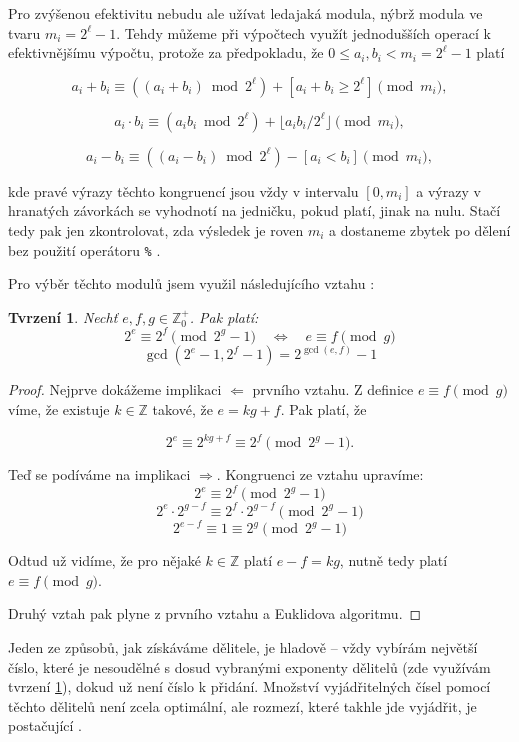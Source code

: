 \documentclass[titlepage]{article}
\newtheorem{claim}{Tvrzení}
\begin{document}
Pro zvýšenou efektivitu nebudu ale užívat ledajaká modula, nýbrž modula ve
tvaru $m_i = 2^{\ell} - 1$. Tehdy můžeme při výpočtech využít jednodušších
operací k efektivnějšímu výpočtu, protože za předpokladu, že $0 \leq a_i,b_i <
m_i = 2^{\ell} - 1$ platí

$$
a_i + b_i \equiv ((a_i+b_i)\bmod 2^{\ell})+[a_i +b_i\geq 2^{\ell}] \pmod{m_i},
$$

$$
a_i \cdot b_i \equiv (a_i b_i \bmod 2^{\ell}) + \lfloor a_i b_i /2^{\ell}\rfloor \pmod{m_i},
$$

$$
a_i - b_i \equiv ((a_i -b_i)\bmod 2^{\ell})-[a_i <b_i] \pmod{m_i},
$$

kde pravé výrazy těchto kongruencí jsou vždy v intervalu $[0, m_i]$ a výrazy v
hranatých závorkách se vyhodnotí na jedničku, pokud platí, jinak na nulu. Stačí
tedy pak jen zkontrolovat, zda výsledek je roven $m_i$ a dostaneme zbytek po
dělení bez použití operátoru \verb|%| \cite{knuth_taocp2}.

Pro výběr těchto modulů jsem využil následujícího vztahu \cite{knuth_taocp2}:

\begin{claim}
  \label{claim:1}
  Nechť $e,f,g \in \mathbb{Z}^+_0$. Pak platí:
$$
  2^e \equiv 2^f \pmod{2^g - 1} \quad \Leftrightarrow \quad e \equiv f \pmod{g}
$$
$$
  \gcd(2^e - 1, 2^f - 1) = 2^{\gcd(e,f)} - 1
$$
\end{claim}
\begin{proof}
  Nejprve dokážeme implikaci $\Leftarrow$ prvního vztahu. Z definice $e \equiv
  f \pmod{g}$ víme, že existuje $k \in \mathbb{Z}$ takové, že $e = k g + f$.
  Pak platí, že

  $$
  2^e \equiv 2^{kg+f} \equiv 2^f \pmod{2^g - 1}.
  $$

  Teď se podíváme na implikaci $\Rightarrow$. Kongruenci ze vztahu upravíme:
  $$
    2^e \equiv 2^f \pmod{2^g - 1}
  $$
  $$
    2^e \cdot 2^{g-f} \equiv 2^f \cdot 2^{g-f} \pmod{2^g - 1}
  $$
  $$
    2^{e-f} \equiv 1 \equiv 2^g \pmod{2^g - 1}
  $$

  Odtud už vidíme, že pro nějaké $k \in \mathbb{Z}$ platí $e-f = k g$, nutně
  tedy platí $e \equiv f \pmod{g}$.

  Druhý vztah pak plyne z prvního vztahu a Euklidova algoritmu.
\end{proof}

Jeden ze způsobů, jak získáváme dělitele, je hladově --  vždy vybírám největší
číslo, které je nesoudělné s dosud vybranými exponenty dělitelů (zde využívám
tvrzení \ref{claim:1}), dokud už není číslo k přidání. Množství vyjádřitelných
čísel pomocí těchto dělitelů není zcela optimální, ale rozmezí, které takhle
jde vyjádřit, je postačující \cite{knuth_taocp2}.
\end{document}

